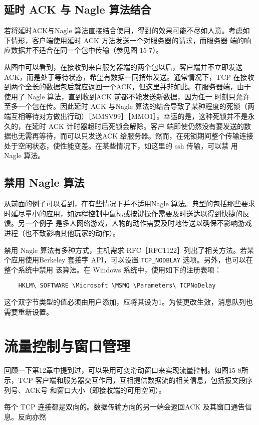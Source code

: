 \subsection{延时 ACK 与 Nagle 算法结合}
若将延时ACK与Nagle 算法直接结合使用，得到的效果可能不尽如人意。考虑如下情形，客户端使用延时 ACK 方法发送一个对服务器的请求，而服务器
端的响应数据并不适合在同一个包中传输（参见图 15-7）。

从图中可以看到，在接收到来自服务器端的两个包以后，客户端并不立即发送 ACK，而是处于等待状态，希望有数据一同捎带发送。通常情况下，TCP
在接收到两个全长的数据包后就应返回一个ACK，但这里并非如此。在服务器端，由于使用了 Nagle 算法，直到收到ACK 前都不能发送新数据，因为任一
时刻只允许至多一个包在传。因此延时
ACK 与Nagle 算法的结合导致了某种程度的死锁（两端互相等待对方做出行动）［MMSV99］［MMO1］。幸运的是，这种死锁并不是永久的，在延时 ACK 计时器超时后死锁会解除。客户
端即使仍然没有要发送的数据也无需再等待，而可以只发送ACK 给服务器。然而，在死锁期间整个传输连接处于空闲状态，使性能变差。在某些情况下，如这里的 ssh 传输，可以禁
用 Nagle 算法。

\subsection{禁用 Nagle 算法}
从前面的例子可以看到，在有些情况下并不适用Nagle 算法。典型的包括那些要求时延尽量小的应用，如远程控制中鼠标或按键操作需要及时送达以得到快捷的反馈。另一个例子
是多人网络游戏，人物的动作需要及时地传送以确保不影响游戏进程（也不致影响其他玩家的动作）。

禁用 Nagle 算法有多种方式，主机需求 RFC［RFC1122］列出了相关方法。若某个应用使用Berkeley 套接字 API，可以设置 \verb|TCP_NODBLAY| 选项。另外，也可以在整个系统中禁用
该算法。在 Windows 系统中，使用如下的注册表项：
\begin{verbatim}
    HKLM\ SOFTWARE \Microsoft \MSMQ \Parameters\ TCPNoDelay
\end{verbatim}
这个双字节类型的值必须由用户添加，应将其设为1。为使更改生效，消息队列也需要重新设置。

\section{流量控制与窗口管理}
回顾一下第12章中提到过，可以采用可变滑动窗口来实现流量控制。如图15-8所示，TCP 客户端和服务器交互作用，互相提供数据流的相关信息，包括报文段序列号、ACK号
和窗口大小（即接收端的可用空间）。

每个 TCP 连接都是双向的。数据传输方向的另一端会返回ACK 及其窗口通告信息。反向亦然

